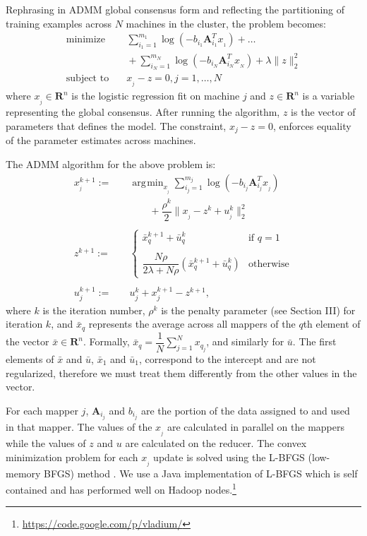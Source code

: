 \documentclass[10pt, conference, compsocconf]{IEEEtran}
\DeclareMathOperator*{\argmin}{arg\!\min}
\begin{document}
Rephrasing in ADMM global consensus form and reflecting the partitioning of training examples across $N$ machines in the cluster, the problem becomes:
\begin{align*}
\text{minimize}&\quad \sum_{i_1=1}^{m_1} \log(-b_{i_1}\mathbf{A}_{i_1}^Tx_{_1})+\ldots \\
&\quad+\sum_{i_N=1}^{m_N} \log(-b_{i_N}\mathbf{A}_{i_N}^Tx_{_N})+\lambda\|z\|_2^2\\
\text{subject to}&\quad x_{_j} - z = 0, j = 1, \ldots, N
\end{align*}
where $x_{_j}\in\mathbf{R}^n$ is the logistic regression fit on machine $j$ and $z\in\mathbf{R}^n$ is a variable representing the global consensus.  After running the algorithm, $z$ is the vector of parameters that defines the model. The constraint, $x_j-z=0$, enforces equality of the parameter estimates across machines.

The ADMM algorithm for the above problem is:
\begin{align}
\label{eq:x}
x_{_j}^{k+1} :=&\quad \argmin_{x_{_j}} \sum_{i_j=1}^{m_j} \log(-b_{i_j}\mathbf{A}_{i_j}^Tx_{_j}) \\
&\quad\quad\quad+ \dfrac{\rho^k}{2}\|x_{_j} - z^k + u_{_j}^k\|_2^2 \nonumber\\
\nonumber\\
\label{eq:z}
z^{k+1} :=&\quad \begin{cases}
    \bar{x}_q^{k+1} + \bar{u}_q^k& \text{if $q=1$}\\
    \\
    \dfrac{N\rho}{2\lambda + N\rho}(\bar{x}_q^{k+1} + \bar{u}_q^k)& \text{otherwise}
  \end{cases}\\
\nonumber\\
\label{eq:u}
u_j^{k+1} :=&\quad u_j^k + x_j^{k+1} - z^{k+1},
\end{align}
where $k$ is the iteration number, $\rho^k$ is the penalty parameter (see Section III) for iteration $k$, and $\bar{x}_q$ represents the average across all mappers of the $q$th element of the vector $\bar{x}\in\mathbf{R}^n$.  Formally, $\bar{x}_q = \dfrac{1}{N}\sum_{j=1}^N x_{q_j}$, and similarly for $\bar{u}$.  The first elements of $\bar{x}$ and $\bar{u}$, $\bar{x}_1$ and $\bar{u}_1$, correspond to the intercept and are not regularized, therefore we must treat them differently from the other values in the vector.

For each mapper $j$, $\mathbf{A}_{i_j}$ and $b_{i_j}$ are the portion of the data assigned to and used in that mapper.  The values of the $x_{_j}$ are calculated in parallel on the mappers while the values of $z$ and $u$ are calculated on the reducer.  The convex minimization problem for each $x_{_j}$ update is solved using the L-BFGS (low-memory BFGS) method \cite{bonnans2003numerical}.  We use a Java implementation of L-BFGS which is self contained and has performed well on Hadoop nodes.\footnote{\url{https://code.google.com/p/vladium/}}
\end{document}
